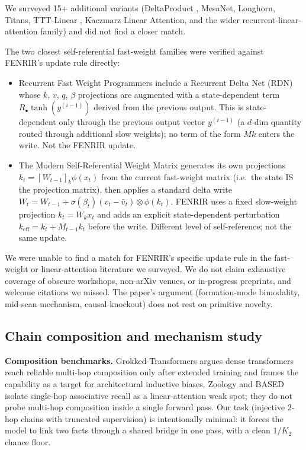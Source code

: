 \documentclass[11pt]{article}
\begin{document}
We surveyed 15+ additional variants (DeltaProduct
\citep{deltaproduct2025}, MesaNet, Longhorn, Titans, TTT-Linear
\citep{sun2024ttt}, Kaczmarz Linear Attention, and the wider
recurrent-linear-attention family) and did not find a closer match.

The two closest self-referential fast-weight families were verified
against FENRIR's update rule directly:

\begin{itemize}
\item Recurrent Fast Weight Programmers \citep{irie2021rfwp} include
      a Recurrent Delta Net (RDN) whose $k$, $v$, $q$, $\beta$
      projections are augmented with a state-dependent term
      $R_{\bullet} \tanh(y^{(i-1)})$ derived from the previous output.
      This is state-dependent only through the previous output vector
      $y^{(i-1)}$ (a $d$-dim quantity routed through additional slow
      weights); no term of the form $M k$ enters the write. Not the
      FENRIR update.
\item The Modern Self-Referential Weight Matrix \citep{irie2022srwm}
      generates its own projections $k_t = [W_{t-1}]_k \phi(x_t)$
      from the current fast-weight matrix (i.e.\ the state IS the
      projection matrix), then applies a standard delta write
      $W_t = W_{t-1} + \sigma(\beta_t)(v_t - \bar{v}_t) \otimes
      \phi(k_t)$. FENRIR uses a fixed slow-weight projection
      $k_t = W_k x_t$ and adds an explicit state-dependent
      perturbation $k_{\text{eff}} = k_t + M_{t-1} k_t$ before the
      write. Different level of self-reference; not the same update.
\end{itemize}

We were unable to find a match for FENRIR's specific update rule in
the fast-weight or linear-attention literature we surveyed. We do
not claim exhaustive coverage of obscure workshops, non-arXiv venues,
or in-progress preprints, and welcome citations we missed. The
paper's argument (formation-mode bimodality, mid-scan mechanism,
causal knockout) does not rest on primitive novelty.

\subsection{Chain composition and mechanism study}

\textbf{Composition benchmarks.} Grokked-Transformers
\citep{wang2024grokked} argues dense transformers reach reliable
multi-hop composition only after extended training and frames the
capability as a target for architectural inductive biases. Zoology
\citep{arora2023zoology} and BASED \citep{arora2024based} isolate
single-hop associative recall as a linear-attention weak spot; they
do not probe multi-hop composition inside a single forward pass. Our
task (injective 2-hop chains with truncated supervision) is
intentionally minimal: it forces the model to link two facts through
a shared bridge in one pass, with a clean $1/K_2$ chance floor.
\end{document}
